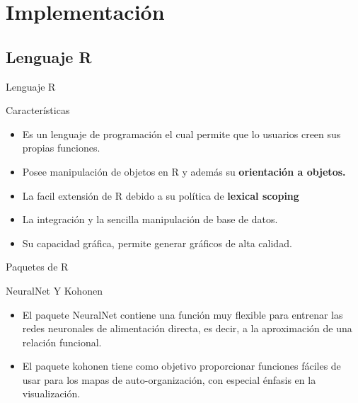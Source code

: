 \documentclass{beamer}
\begin{document}
\section{Implementación}
\subsection{Lenguaje R}
\begin{frame}{Lenguaje R}
\begin{block}{Características}
\begin{itemize}
\item Es un lenguaje de programación el cual permite que lo usuarios creen sus propias funciones.
\item Posee manipulación de objetos en R y además su \textbf{orientación a objetos.}
\item La facil extensión de R debido a su política de \textbf{lexical scoping}
\item La integración y la sencilla manipulación de base de datos.
\item Su capacidad gráfica, permite generar gráficos de alta calidad.\\
\end{itemize}
\end{block}
\end{frame}

\begin{frame}{Paquetes de R}
\begin{block}{NeuralNet Y Kohonen}
\begin{itemize}
\item El paquete NeuralNet contiene una función muy flexible para entrenar las redes neuronales de alimentación directa, es decir, a la aproximación de una relación funcional.

\item El paquete kohonen tiene como objetivo proporcionar funciones fáciles de usar para los mapas de auto-organización, con especial énfasis en la visualización.
\end{itemize}
\end{block}
\end{frame}
\end{document}
